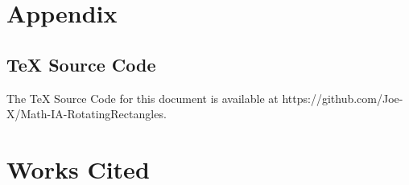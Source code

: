 \documentclass{article}
\begin{document}
        \section{Appendix}
        \subsection{TeX Source Code} The TeX Source Code for this document is available at https://github.com/Joe-X/Math-IA-RotatingRectangles.
        
        \newpage
        \section{Works Cited}
        \printbibliography
    \newpage
    
\end{document}
